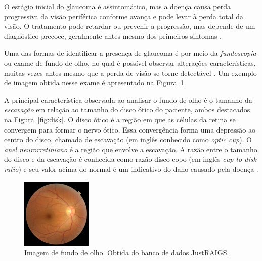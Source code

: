 \documentclass[12pt]{article}
\begin{document}
O estágio inicial do glaucoma é assintomático, mas a doença causa perda progressiva da visão periférica conforme avança e pode levar à perda total da visão. O tratamento pode retardar ou prevenir a progressão, mas depende de um diagnóstico precoce, geralmente antes mesmo dos primeiros sintomas \cite{who_2019}.

Uma das formas de identificar a presença de glaucoma é por meio da \emph{fundoscopia} ou exame de fundo de olho, no qual é possível observar alterações características, muitas vezes antes mesmo que a perda de visão se torne detectável \cite{weinreb_2004}. Um exemplo de imagem obtida nesse exame é apresentado na Figura~\ref{fig:fundus}.

A principal característica observada ao analisar o fundo de olho é o tamanho da \emph{escavação} em relação ao tamanho do disco ótico do paciente, ambos destacados na Figura~\ref{fig:disk}. O disco ótico é a região em que as células da retina se convergem para formar o nervo ótico. Essa convergência forma uma depressão ao centro do disco, chamada de escavação (em inglês conhecido como \emph{optic cup}). O \emph{anel neurorretiniano} é a região que envolve a escavação. A razão entre o tamanho do disco e da escavação é conhecida como razão disco-copo (em inglês \emph{cup-to-disk ratio}) e seu valor acima do normal é um indicativo do dano causado pela doença \cite{weinreb_2004}. %

\begin{figure}[htb]
 \centering
 \includegraphics[width=0.3\textwidth]{images/TRAIN000004_cut.JPG}
 \caption{Imagem de fundo de olho. Obtida do banco de dados JustRAIGS.}
 \label{fig:fundus}
\end{figure}

%
\end{document}
